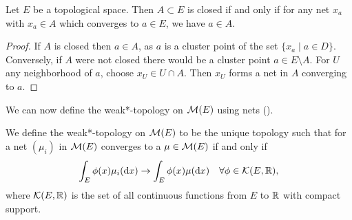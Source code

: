 \begin{proposition}
	Let $E$ be a topological space. Then $A\subset E$ is closed if and only if for any net $x_a$ with $x_a\in A$ which converges to $a\in E$, we have $a\in A$.
\end{proposition}
\begin{proof}
	If $A$ is closed then $a\in A$, as $a$ is a cluster point of the set $\{x_a\mid a\in D\}$. Conversely, if $A$ were not closed there would be a cluster point $a\in E\setminus A$. For $U$ any neighborhood of $a$, choose $x_U\in U\cap A$. Then $x_U$ forms a net in $A$ converging to $a$.
\end{proof}

We can now define the weak*-topology on $\mathcal{M}(E)$ using nets (\cite[see][]{choquet:analysis}).
\begin{definition}
	We define the weak*-topology on $\mathcal{M}(E)$ to be the unique topology such that for a net $(\mu_i)$ in $\mathcal{M}(E)$ converges to a $\mu\in \mathcal{M}(E)$ if and only if 
	\[
	\int_E\phi(x)\mu_i(\mathrm{d}x)\rightarrow\int_E\phi(x)\mu(\mathrm{d}x)\quad \forall \phi\in \mathcal{K}(E,\mathbb{R}),
	\]
	where $\mathcal{K}(E,\mathbb{R})$ is the set of all continuous functions from $E$ to $\mathbb{R}$ with compact support.
\end{definition}





